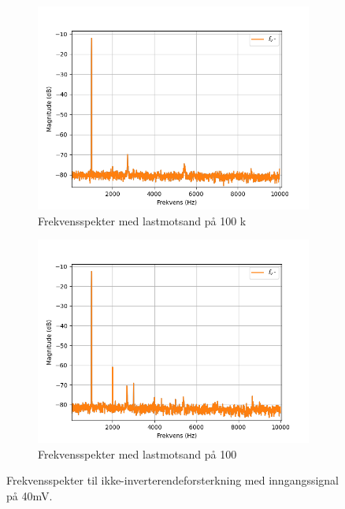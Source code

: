 \begin{figure}[H]
    \centering
    \begin{subfigure}{.5\textwidth}
        \centering
        \includegraphics[width=1\linewidth]{./Images/03Research/noninvertingspektrum100k.png}
        \caption{Frekvensspekter med lastmotsand på 100 k\text{$\Omega$}}
        \label{fig:ikkeinvspek100k}
    \end{subfigure}%
    \begin{subfigure}{.5\textwidth}
        \centering
        \includegraphics[width=1\linewidth]{./Images/03Research/noninvertingspektrum100.png}
        \caption{Frekvensspekter med lastmotsand på 100 \text{$\Omega$}}
        \label{fig:ikkeinvspek100}
    \end{subfigure}
    \caption{Frekvensspekter til ikke-inverterendeforsterkning med inngangssignal på 40mV.}
    \label{fig:ikkeinvspek}
\end{figure}

